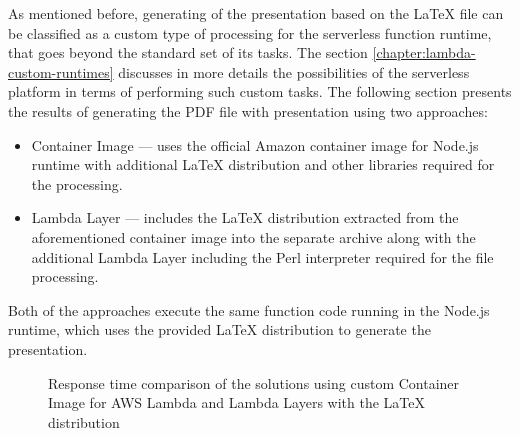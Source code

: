 As mentioned before, generating of the presentation based on the LaTeX file can be classified as a custom type of processing for the serverless function runtime, that goes beyond the standard set of its tasks. The section \ref{chapter:lambda-custom-runtimes} discusses in more details the possibilities of the serverless platform in terms of performing such custom tasks. The following section presents the results of generating the PDF file with presentation using two approaches:

\begin{itemize}
   \item Container Image --- uses the official Amazon container image for Node.js runtime with additional LaTeX distribution and other libraries required for the processing.
   \item Lambda Layer --- includes the LaTeX distribution extracted from the aforementioned container image into the separate archive along with the additional Lambda Layer including the Perl interpreter required for the file processing.
\end{itemize}

Both of the approaches execute the same function code running in the Node.js runtime, which uses the provided LaTeX distribution to generate the presentation.

\datasetLayerVsImage

\begin{figure}[H]
    \caption{Response time comparison of the solutions using custom Container Image for AWS Lambda and Lambda Layers with the LaTeX distribution}
    \label{chart:step-function-lambda-layer-vs-container-image}
\end{figure}

